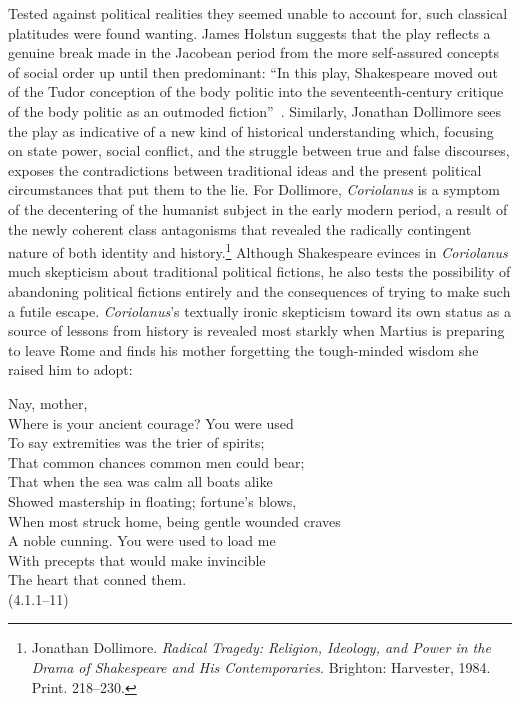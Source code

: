 Tested against political realities they seemed unable to account for, such classical platitudes were found wanting.
James Holstun suggests that the play reflects a genuine break made in the Jacobean period from the more self-assured concepts of social order up until then predominant: ``In this play, Shakespeare moved out of the Tudor conception of the body politic into the seventeenth-century critique of the body politic as an outmoded fiction''~\cite[492]{holstun_tragic_1983}.
Similarly, Jonathan Dollimore sees the play as indicative of a new kind of historical understanding which, focusing on state power, social conflict, and the struggle between true and false discourses, exposes the contradictions between traditional ideas and the present political circumstances that put them to the lie.
For Dollimore, \emph{Coriolanus} is a symptom of the decentering of the humanist subject in the early modern period, a result of the newly coherent class antagonisms that revealed the radically contingent nature of both identity and history.\footnote{Jonathan Dollimore. \emph{Radical Tragedy: Religion, Ideology, and Power in the Drama of Shakespeare and His Contemporaries}. Brighton: Harvester, 1984. Print. 218--230. \nocite{dollimore_radical_1984}} 
Although Shakespeare evinces in \emph{Coriolanus} much skepticism about traditional political fictions, he also tests the possibility of abandoning political fictions entirely and the consequences of trying to make such a futile escape.
\emph{Coriolanus}'s textually ironic skepticism toward its own status as a source of lessons from history is revealed most starkly when Martius is preparing to leave Rome and finds his mother forgetting the tough-minded wisdom she raised him to adopt:
\begin{vq}
Nay, mother,\\
Where is your ancient courage? You were used\\
To say extremities was the trier of spirits;\\
That common chances common men could bear;\\
That when the sea was calm all boats alike\\
Showed mastership in floating; fortune's blows,\\
When most struck home, being gentle wounded craves\\
A noble cunning.
You were used to load me\\
With precepts that would make invincible\\
The heart that conned them.\\
\hfill(4.1.1--11)
\end{vq}
